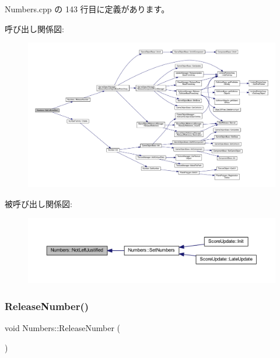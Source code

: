 Numbers.\+cpp の 143 行目に定義があります。

呼び出し関係図\+:\nopagebreak
\begin{figure}[H]
\begin{center}
\leavevmode
\includegraphics[width=350pt]{class_numbers_a1aaad1f057da0064766bfd25d57caa17_cgraph}
\end{center}
\end{figure}
被呼び出し関係図\+:\nopagebreak
\begin{figure}[H]
\begin{center}
\leavevmode
\includegraphics[width=350pt]{class_numbers_a1aaad1f057da0064766bfd25d57caa17_icgraph}
\end{center}
\end{figure}
\mbox{\label{class_numbers_a1eb0843ca2449c52e21c84b96bfa4dc5}} 
\subsubsection{\texorpdfstring{Release\+Number()}{ReleaseNumber()}}
{\footnotesize\ttfamily void Numbers\+::\+Release\+Number (\begin{DoxyParamCaption}{ }\end{DoxyParamCaption})\hspace{0.3cm}{\ttfamily [private]}}



